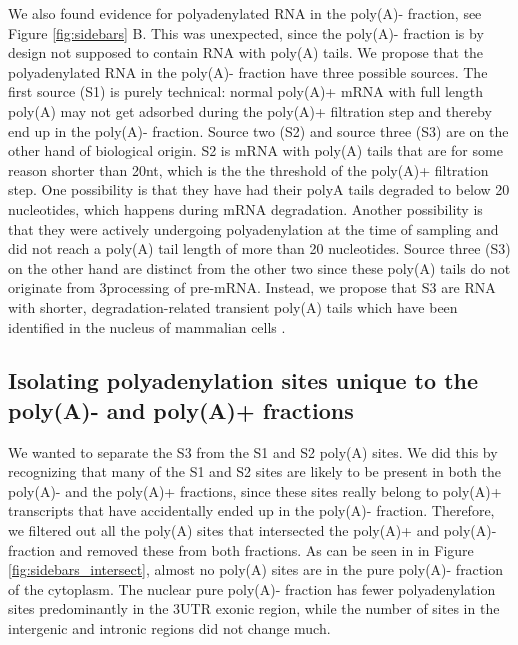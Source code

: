 We also found evidence for polyadenylated RNA in the poly(A)- fraction, see
Figure \ref{fig:sidebars} B. This was unexpected, since the poly(A)- fraction
is by design not supposed to contain RNA with poly(A) tails. We propose that
the polyadenylated RNA in the poly(A)- fraction have three possible sources.
The first source (S1) is purely technical: normal poly(A)+ mRNA with full
length poly(A) may not get adsorbed during the poly(A)+ filtration step and
thereby end up in the poly(A)- fraction. Source two (S2) and source three (S3)
are on the other hand of biological origin. S2 is mRNA with poly(A) tails that
are for some reason shorter than 20nt, which is the the threshold of the
poly(A)+ filtration step. One possibility is that they have had their polyA
tails degraded to below 20 nucleotides, which happens during mRNA degradation.
Another possibility is that they were actively undergoing polyadenylation at
the time of sampling and did not reach a poly(A) tail length of more than 20
nucleotides. Source three (S3) on the other hand are distinct from the other
two since these poly(A) tails do not originate from 3\p processing of pre-mRNA.
Instead, we propose that S3 are RNA with shorter, degradation-related transient
poly(A) tails which have been identified in the nucleus of mammalian cells
\cite{lemay_nuclear_2010}.

\subsection{Isolating polyadenylation sites unique to the poly(A)- and poly(A)+
fractions}
We wanted to separate the S3 from the S1 and S2 poly(A) sites. We did this by
recognizing that many of the S1 and S2 sites are likely to be present in both
the poly(A)- and the poly(A)+ fractions, since these sites really belong to
poly(A)+ transcripts that have accidentally ended up in the poly(A)- fraction.
Therefore, we filtered out all the poly(A) sites that intersected the poly(A)+
and poly(A)- fraction and removed these from both fractions. As can be seen in
in Figure \ref{fig:sidebars_intersect}, almost no poly(A) sites are in the pure
poly(A)- fraction of the cytoplasm. The nuclear pure poly(A)- fraction has
fewer polyadenylation sites predominantly in the 3UTR exonic region, while the
number of sites in the intergenic and intronic regions did not change much.

